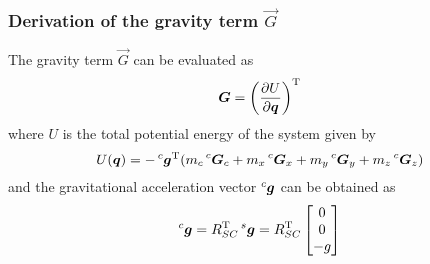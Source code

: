 \subsubsection{Derivation of the gravity term $\vec{G}$}
The gravity term $\vec{G}$ can be evaluated as
\[
\vec{G} =\left(\frac{\partial U}{\partial \vec{q}}\right) \transpose
\]
where $U$ is the total potential energy of the system given by
\[
U(\vec{q}) = - \prescript{c}{}{\vec{g}} \transpose
(m_c  \prescript{c}{}{\vec{G}}_c +
m_x  \prescript{c}{}{\vec{G}}_x +
m_y  \prescript{c}{}{\vec{G}}_y +
m_z  \prescript{c}{}{\vec{G}}_z)
\]
and the gravitational acceleration vector $\prescript{c}{}{\vec{g}}$ can be obtained as
\[
\prescript{c}{}{\vec{g}} = R_{SC}\transpose \prescript{s}{}{\vec{g}} = R_{SC}\transpose 
\begin{bmatrix}
  0\\
  0\\
  -g
\end{bmatrix}
\]

